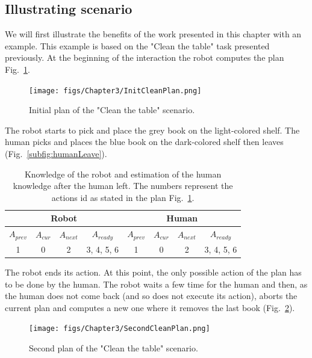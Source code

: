 \documentclass[english,a4paper,11pt,twoside]{StyleThese}
\begin{document}
\subsection{Illustrating scenario}

We will first illustrate the benefits of the work presented in this chapter with an example. This example is based on the "Clean the table" task presented previously. At the beginning of the interaction the robot computes the plan Fig.~\ref{fig:initPlanClean}. 

\begin{figure}[!h]
	\centering
    \texttt{[image: figs/Chapter3/InitCleanPlan.png]}
    \caption{Initial plan of the "Clean the table" scenario. }
    \label{fig:initPlanClean}
\end{figure}

\newpage
The robot starts to pick and place the grey book on the light-colored shelf. The human picks and places the blue book on the dark-colored shelf then leaves (Fig.~\ref{subfig:humanLeave}).

\begin{table}[!h]
\begin{center}
\begin{tabular}{|c|c|c|c||c|c|c|c|}
\hline
\multicolumn{4}{|c||}{Robot} & \multicolumn{4}{c|}{Human}\\
\hline
$A_{prev}$ & $A_{cur}$ & $A_{next}$ & $A_{ready}$ & $A_{prev}$ & $A_{cur}$ & $A_{next}$ & $A_{ready}$\\
\hline
\hline
1 & 0 & 2 & 3, 4, 5, 6 & 1 & 0 & 2 & 3, 4, 5, 6\\
\hline
\end{tabular}
\end{center}
\caption{Knowledge of the robot and estimation of the human knowledge after the human left. The numbers represent the actions id as stated in the plan Fig.~\ref{fig:initPlanClean}.}
\label{table:results}
\end{table}

The robot ends its action. At this point, the only possible action of the plan has to be done by the human. The robot waits a few time for the human and then, as the human does not come back (and so does not execute its action), aborts the current plan and computes a new one where it removes the last book (Fig.~\ref{fig:newplan}).

\begin{figure}[!h]
	\centering
    \texttt{[image: figs/Chapter3/SecondCleanPlan.png]}
    \caption{Second plan of the "Clean the table" scenario.}
    \label{fig:newplan}
\end{figure}
\end{document}
